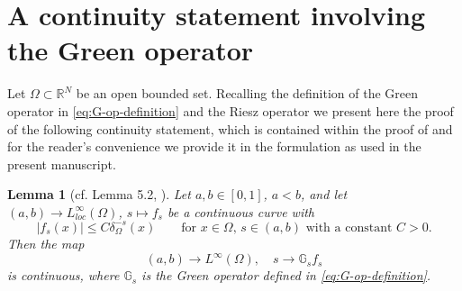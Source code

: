 \documentclass[notitlepage,11pt,reqno]{amsart}
\newtheorem{lemma}[theorem]{Lemma}
\theoremstyle{definition}
\numberwithin{equation}{section}
\newcommand{\cGs}{{\mathbb G}}
\newcommand{\R}{\mathds{R}}
\begin{document}
\section{A continuity statement involving the Green operator}\label{weighted limit2}


Let $\Omega\subset\R^N$ be an open bounded set. Recalling the definition of the Green operator in \eqref{eq:G-op-definition} and the Riesz operator we present here the proof of the following continuity statement, which is contained within the proof of \cite[Theorem 6.1]{JSW20} and for the reader's convenience we provide it in the formulation as used in the present manuscript.
\begin{lemma}[cf. Lemma 5.2, \cite{JSW20}]\label{lemma:continuity-smooth2app}
	Let $a,b \in [0,1]$, $a<b$, and let $(a,b)\to L^{\infty}_{loc}(\Omega)$, $s\mapsto f_s$ be a continuous curve with 
  \begin{equation}
    \label{lemma:continuity-smooth2app-add-0}
|f_s(x)|\leq C\delta_{\Omega}^{-s}(x) \qquad \text{for $x \in \Omega$, $s \in (a,b)$ with a constant $C>0$.}
\end{equation}
Then the map
$$
(a,b)\to L^{\infty}(\Omega),\quad s\to \cGs_sf_s
$$
is continuous, where $\cGs_{s}$ is the Green operator defined in \eqref{eq:G-op-definition}.
\end{lemma}
\end{document}
